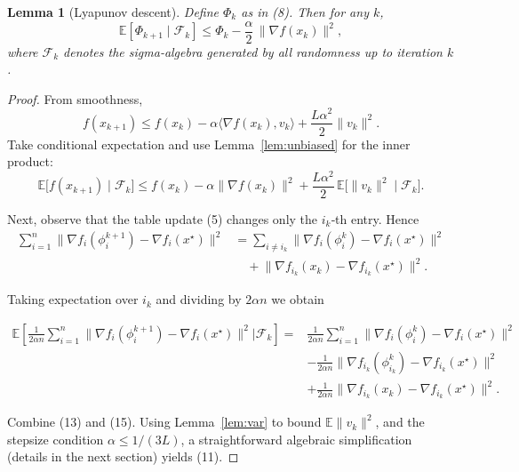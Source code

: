 \documentclass{article}
\newtheorem{lemma}{Lemma}
\begin{document}
\begin{lemma}[Lyapunov descent]\label{lem:lyapunov}
Define $\Phi_k$ as in (8). Then for any $k$,
\[
\mathbb{E}\!\left[\Phi_{k+1}\mid\mathcal{F}_k\right]
\le \Phi_k-\frac{\alpha}{2}\,\big\|\nabla f(x_k)\big\|^{2},
\tag{11}
\]
where $\mathcal{F}_k$ denotes the sigma‑algebra generated by all randomness up to iteration $k$.
\end{lemma}
\begin{proof}
From smoothness,
\[
f(x_{k+1})\le f(x_k)-\alpha\langle\nabla f(x_k),v_k\rangle
            +\frac{L\alpha^{2}}{2}\|v_k\|^{2}.
\tag{12}
\]
Take conditional expectation and use Lemma~\ref{lem:unbiased} for the inner product:
\[
\mathbb{E}\big[f(x_{k+1})\mid\mathcal{F}_k\big]
\le f(x_k)-\alpha\|\nabla f(x_k)\|^{2}
     +\frac{L\alpha^{2}}{2}\,\mathbb{E}\big[\|v_k\|^{2}\mid\mathcal{F}_k\big].
\tag{13}
\]

Next, observe that the table update (5) changes only the $i_k$‑th entry.
Hence
\[
\begin{aligned}
\sum_{i=1}^{n}\!\big\|\nabla f_i(\phi_i^{k+1})-\nabla f_i(x^{\star})\big\|^{2}
&= \sum_{i\neq i_k}\!\big\|\nabla f_i(\phi_i^{k})-\nabla f_i(x^{\star})\big\|^{2}\\
&\quad+\big\|\nabla f_{i_k}(x_k)-\nabla f_{i_k}(x^{\star})\big\|^{2}.
\end{aligned}
\tag{14}
\]

Taking expectation over $i_k$ and dividing by $2\alpha n$ we obtain

\[
\begin{aligned}
\mathbb{E}\!\left[
\frac{1}{2\alpha n}\!\sum_{i=1}^{n}\!\big\|\nabla f_i(\phi_i^{k+1})-\nabla f_i(x^{\star})\big\|^{2}
\Big|\mathcal{F}_k\right]
=&\frac{1}{2\alpha n}\!\sum_{i=1}^{n}\!\big\|\nabla f_i(\phi_i^{k})-\nabla f_i(x^{\star})\big\|^{2}\\
&-\frac{1}{2\alpha n}\!\big\|\nabla f_{i_k}(\phi_{i_k}^{k})-\nabla f_{i_k}(x^{\star})\big\|^{2}\\
&+\frac{1}{2\alpha n}\!\big\|\nabla f_{i_k}(x_k)-\nabla f_{i_k}(x^{\star})\big\|^{2}.
\end{aligned}
\tag{15}
\]

Combine (13) and (15). Using Lemma~\ref{lem:var} to bound $\mathbb{E}\|v_k\|^{2}$,
and the stepsize condition $\alpha\le 1/(3L)$, a straightforward algebraic
simplification (details in the next section) yields (11). \hfill\qedsymbol
\end{proof}

\end{document}
